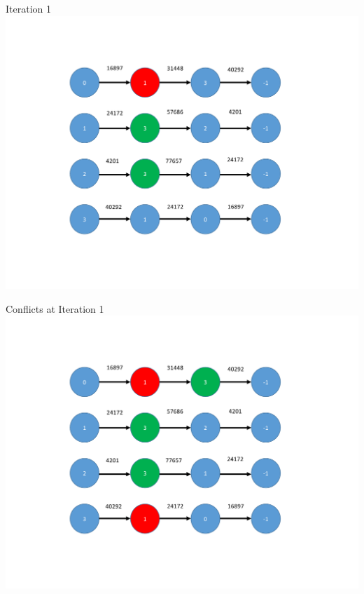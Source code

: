 \documentclass[xcolor={usenames,dvipsnames,svgnames,table}]{beamer}
\begin{document}
\begin{frame}[t]{Iteration 1}
\centering
\includegraphics[trim={2cm 2cm 4cm 2cm},clip,scale=0.45]{figures/iteration1.pdf}
\end{frame}

\begin{frame}[t]{Conflicts at Iteration 1}
\centering
\includegraphics[trim={2cm 2cm 4cm 2cm},clip,scale=0.45]{figures/iteration1_conflicts.pdf}
\end{frame}
\end{document}
